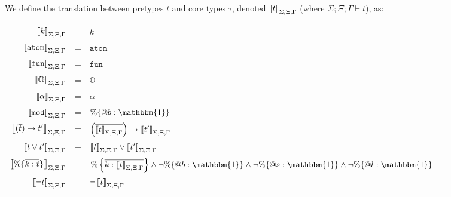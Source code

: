\documentclass[12pt]{article}
\newcommand{\Gammatop}{\ensuremath{\Xi}}
\newcommand{\Gammabot}{\ensuremath{\Gamma}}
\newcommand{\atom}{\texttt{atom}}
\renewcommand{\mod}{\texttt{mod}}
\newcommand{\toptype}{\mathbbm{1}}
\newcommand{\fun}{\texttt{fun}}
\begin{document}
We define the translation between pretypes $t$ and core types $\tau$, denoted $\interp{t}$ (where $\Sigma; \Gammatop; \Gammabot \vdash t$), as:
\begin{center}
    \begin{tabular}{rcll}
        $ \interp{k} $                             & = & $k$                                                                                                                                                         \\
        $ \interp{\atom} $                         & = & $\atom$                                                                                                                                                     \\
        $ \interp{\fun} $                          & = & $\fun$                                                                                                                                                      \\
        $ \interp{\mathbb{O}} $                    & = & $\mathbb{O}$                                                                                                                                                \\
        $ \interp{\alpha} $                        & = & $\alpha$                                                                                                                                                    \\[1.5mm]
        $ \interp{\mod} $                          & = & $\% \{ @b: \toptype \}$                                                                                                                                     \\[1.5mm]
        $ \interp{(\overline{t}) \rightarrow t'} $ & = & $\left(\overline{\interp{t}}\right) \rightarrow \interp{t'}$                                                                                                \\[1.5mm]
        $ \interp{t \vee t' } $                    & = & $\interp{t} \vee \interp{t'}$                                                                                                                               \\[1.5mm]
        $\interp{\%\{ \overline{k : t} \}}$        & = & $\% \left\{ \overline{k : \interp{t}} \right\} \wedge \lnot \% \{ @b : \toptype \} \wedge \lnot \% \{ @s : \toptype \} \wedge \lnot \% \{ @l : \toptype \}$ \\[1.5mm]
        $ \interp{\lnot t} $                       & = & $\lnot\interp{t}$                                                                                                                                           \\[1.5mm]
    \end{tabular}
\end{center}
\end{document}
